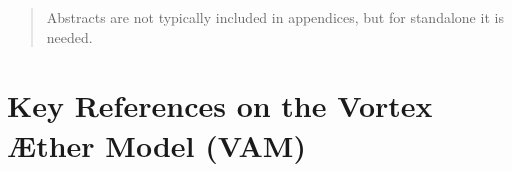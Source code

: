\documentclass[12pt]{article}
\begin{document}
  \titlepageOpen

  \begin{abstract}
      Abstracts are not typically included in appendices, but for standalone it is needed.
  \end{abstract}

  \titlepageClose
\fi


\section{\appendixtitleII}
\section*{Key References on the Vortex Æther Model (VAM)}
\end{document}
